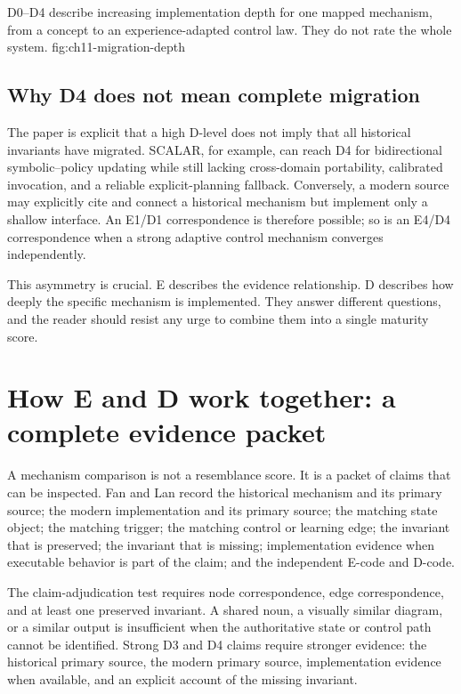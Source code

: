   {D0--D4 describe increasing implementation depth for one mapped mechanism, from a concept to an experience-adapted control law. They do not rate the whole system.}
  {fig:ch11-migration-depth}

\subsection{Why D4 does not mean complete migration}

The paper is explicit that a high D-level does not imply that all historical invariants have migrated. SCALAR, for example, can reach D4 for bidirectional symbolic--policy updating while still lacking cross-domain portability, calibrated invocation, and a reliable explicit-planning fallback. Conversely, a modern source may explicitly cite and connect a historical mechanism but implement only a shallow interface. An E1/D1 correspondence is therefore possible; so is an E4/D4 correspondence when a strong adaptive control mechanism converges independently.

This asymmetry is crucial. E describes the evidence relationship. D describes how deeply the specific mechanism is implemented. They answer different questions, and the reader should resist any urge to combine them into a single maturity score.

\section{How E and D work together: a complete evidence packet}
\label{sec:ch11-evidence-packet}

A mechanism comparison is not a resemblance score. It is a packet of claims that can be inspected. Fan and Lan record the historical mechanism and its primary source; the modern implementation and its primary source; the matching state object; the matching trigger; the matching control or learning edge; the invariant that is preserved; the invariant that is missing; implementation evidence when executable behavior is part of the claim; and the independent E-code and D-code.

The claim-adjudication test requires node correspondence, edge correspondence, and at least one preserved invariant. A shared noun, a visually similar diagram, or a similar output is insufficient when the authoritative state or control path cannot be identified. Strong D3 and D4 claims require stronger evidence: the historical primary source, the modern primary source, implementation evidence when available, and an explicit account of the missing invariant.

